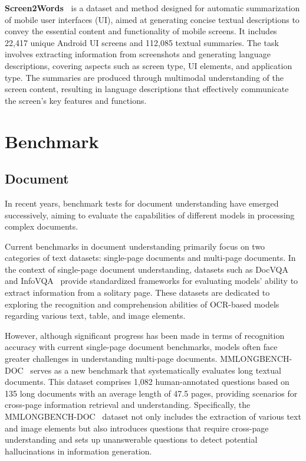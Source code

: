 \noindent \textbf{Screen2Words~\cite{wang2021screen2words}} is a dataset and method designed for automatic summarization of mobile user interfaces (UI), aimed at generating concise textual descriptions to convey the essential content and functionality of mobile screens. It includes 22,417 unique Android UI screens and 112,085 textual summaries. The task involves extracting information from screenshots and generating language descriptions, covering aspects such as screen type, UI elements, and application type. The summaries are produced through multimodal understanding of the screen content, resulting in language descriptions that effectively communicate the screen's key features and functions.


\section{Benchmark}
\subsection{Document}
In recent years, benchmark tests for document understanding have emerged successively, aiming to evaluate the capabilities of different models in processing complex documents.

Current benchmarks in document understanding primarily focus on two categories of text datasets: single-page documents and multi-page documents. In the context of single-page document understanding, datasets such as DocVQA~\cite{mathew2021docvqa} and InfoVQA~\cite{mathew2022infographicvqa} provide standardized frameworks for evaluating models' ability to extract information from a solitary page. These datasets are dedicated to exploring the recognition and comprehension abilities of OCR-based models regarding various text, table, and image elements.

However, although significant progress has been made in terms of recognition accuracy with current single-page document benchmarks, models often face greater challenges in understanding multi-page documents. MMLONGBENCH-DOC~\cite{Ma2024NEURIPS_MMLongBench_Doc_Benchmarking} serves as a new benchmark that systematically evaluates long textual documents. This dataset comprises 1,082 human-annotated questions based on 135 long documents with an average length of 47.5 pages, providing scenarios for cross-page information retrieval and understanding. Specifically, the MMLONGBENCH-DOC~\cite{Ma2024NEURIPS_MMLongBench_Doc_Benchmarking} dataset not only includes the extraction of various text and image elements but also introduces questions that require cross-page understanding and sets up unanswerable questions to detect potential hallucinations in information generation.

